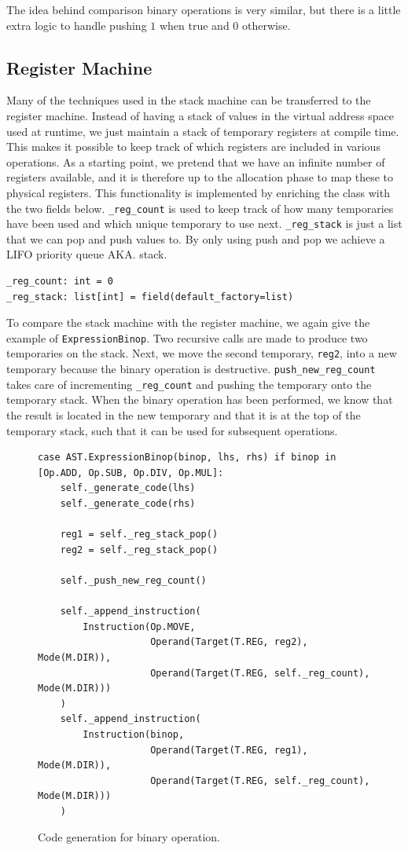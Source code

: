 The idea behind comparison binary operations is very similar, but there is a little extra logic to handle pushing $1$ when true and $0$ otherwise.

\subsection{Register Machine}
Many of the techniques used in the stack machine can be transferred to the register machine. Instead of having a stack of values in the virtual address space used at runtime, we just maintain a stack of temporary registers at compile time. This makes it possible to keep track of which registers are included in various operations. As a starting point, we pretend that we have an infinite number of registers available, and it is therefore up to the allocation phase to map these to physical registers. This functionality is implemented by enriching the class with the two fields below. \texttt{\_reg\_count} is used to keep track of how many temporaries have been used and which unique temporary to use next. \texttt{\_reg\_stack} is just a list that we can pop and push values to. By only using push and pop we achieve a LIFO priority queue AKA. stack.

\begin{verbatim}
_reg_count: int = 0
_reg_stack: list[int] = field(default_factory=list)
\end{verbatim}

To compare the stack machine with the register machine, we again give the example of \texttt{ExpressionBinop}. Two recursive calls are made to produce two temporaries on the stack. Next, we move the second temporary, \texttt{reg2}, into a new temporary because the binary operation is destructive. \texttt{push\_new\_reg\_count} takes care of incrementing \texttt{\_reg\_count} and pushing the temporary onto the temporary stack. When the binary operation has been performed, we know that the result is located in the new temporary and that it is at the top of the temporary stack, such that it can be used for subsequent operations.

\begin{figure}[H]
\begin{verbatim}
case AST.ExpressionBinop(binop, lhs, rhs) if binop in [Op.ADD, Op.SUB, Op.DIV, Op.MUL]:
    self._generate_code(lhs)
    self._generate_code(rhs)

    reg1 = self._reg_stack_pop()
    reg2 = self._reg_stack_pop()

    self._push_new_reg_count()

    self._append_instruction(
        Instruction(Op.MOVE,
                    Operand(Target(T.REG, reg2), Mode(M.DIR)),
                    Operand(Target(T.REG, self._reg_count), Mode(M.DIR)))
    )
    self._append_instruction(
        Instruction(binop,
                    Operand(Target(T.REG, reg1), Mode(M.DIR)),
                    Operand(Target(T.REG, self._reg_count), Mode(M.DIR)))
    )
\end{verbatim}
\caption{Code generation for binary operation.}
\label{fig:binop}
\end{figure}


